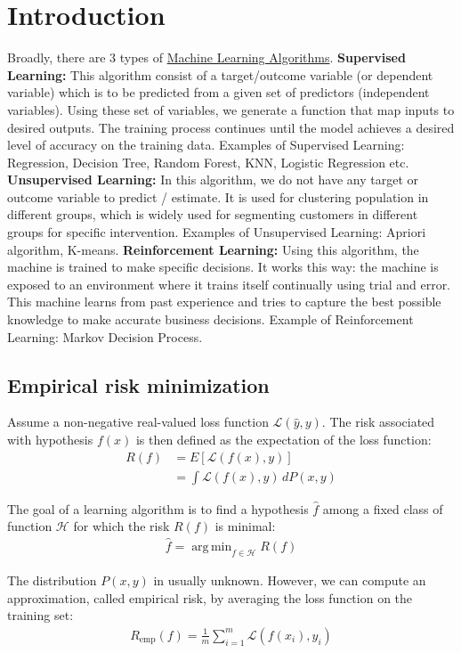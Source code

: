 \documentclass{book}
\DeclareMathOperator*{\argmin}{arg\,min}
\begin{document}
\chapter{Introduction}
Broadly, there are 3 types of \href{https://www.analyticsvidhya.com/blog/2017/09/common-machine-learning-algorithms/}{Machine Learning Algorithms}.
\textbf{Supervised Learning:} This algorithm consist of a target/outcome variable (or dependent variable) which is to be predicted from a given set of predictors (independent variables). Using these set of variables, we generate a function that map inputs to desired outputs. The training process continues until the model achieves a desired level of accuracy on the training data. Examples of Supervised Learning: Regression, Decision Tree, Random Forest, KNN, Logistic Regression etc.
\textbf{Unsupervised Learning:} In this algorithm, we do not have any target or outcome variable to predict / estimate.  It is used for clustering population in different groups, which is widely used for segmenting customers in different groups for specific intervention. Examples of Unsupervised Learning: Apriori algorithm, K-means.
\textbf{Reinforcement Learning:} Using this algorithm, the machine is trained to make specific decisions. It works this way: the machine is exposed to an environment where it trains itself continually using trial and error. This machine learns from past experience and tries to capture the best possible knowledge to make accurate business decisions. Example of Reinforcement Learning: Markov Decision Process.

\section{Empirical risk minimization}
Assume a non-negative real-valued loss function $\mathcal{L}(\hat{y},y)$.
The risk associated with hypothesis $f(x)$ is then defined as the expectation of the loss function:
\begin{align*}
R(f) &= E[\mathcal{L}(f(x),y)] \\
	    &= \int{\mathcal{L}(f(x),y)}\,dP(x,y)
\end{align*}

The goal of a learning algorithm is to find a hypothesis $\hat{f}$ among a fixed class of function $\mathcal{H}$ for which the risk $R(f)$ is minimal:
\begin{align*}
\hat{f} = \argmin_{f \in \mathcal{H}}{R(f)}
\end{align*}

The distribution $P(x,y)$ in usually unknown. However, we can compute an approximation, called empirical risk, by averaging the loss function on the training set:
\begin{align*}
R_{\mbox{emp}}(f) = \frac{1}{m} \sum_{i=1}^{m} \mathcal{L}(f(x_i),y_i)
\end{align*} 
\end{document}
